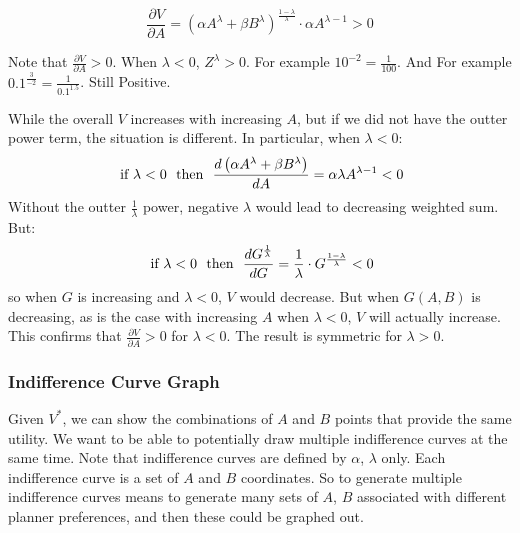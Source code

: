 \documentclass[
]{book}
\begin{document}
\[
    \frac{\partial V}{\partial A}
    =
    \left(
    \alpha
    A^{\lambda}
    +
    \beta
    B^{\lambda}
    \right)^{\frac{1-\lambda}{\lambda}}
    \cdot
    \alpha
    A^{\lambda -1}
    >0
\]

Note that \(\frac{\partial V}{\partial A}>0\). When \(\lambda <0\), \(Z^{\lambda}>0\). For example \(10^{-2}=\frac{1}{100}\). And For example \(0.1^{\frac{3}{-2}}=\frac{1}{0.1^{1.5}}\). Still Positive.

While the overall \(V\) increases with increasing \(A\), but if we did not have the outter power term, the situation is different. In particular, when \(\lambda < 0\):
\[
\text{ if } \lambda <0
\thinspace\thinspace
\text{ then }
\thinspace\thinspace
\frac{d \left(\alpha A^{\lambda} + \beta B^{\lambda}\right)}{dA}=\alpha\lambda A^{\lambda -1}<0
\]
Without the outter \(\frac{1}{\lambda}\) power, negative \(\lambda\) would lead to decreasing weighted sum. But:
\[
\text{ if } \lambda <0
\thinspace\thinspace
\text{ then }
\thinspace\thinspace
\frac{dG^{\frac{1}{\lambda}}}{dG}=\frac{1}{\lambda}\cdot G^{\frac{1-\lambda}{\lambda}}<0
\]
so when \(G\) is increasing and \(\lambda <0\), \(V\) would decrease. But when \(G\left(A,B\right)\) is decreasing, as is the case with increasing \(A\) when \(\lambda <0\), \(V\) will actually increase. This confirms that \(\frac{\partial V}{\partial A}>0\) for \(\lambda <0\). The result is symmetric for \(\lambda >0\).

\hypertarget{indifference-curve-graph}{%
\subsubsection{Indifference Curve Graph}\label{indifference-curve-graph}}

Given \(V^{\ast}\), we can show the combinations of \(A\) and \(B\) points that provide the same utility. We want to be able to potentially draw multiple indifference curves at the same time. Note that indifference curves are defined by \(\alpha\), \(\lambda\) only. Each indifference curve is a set of \(A\) and \(B\) coordinates. So to generate multiple indifference curves means to generate many sets of \(A\), \(B\) associated with different planner preferences, and then these could be graphed out.
\end{document}
